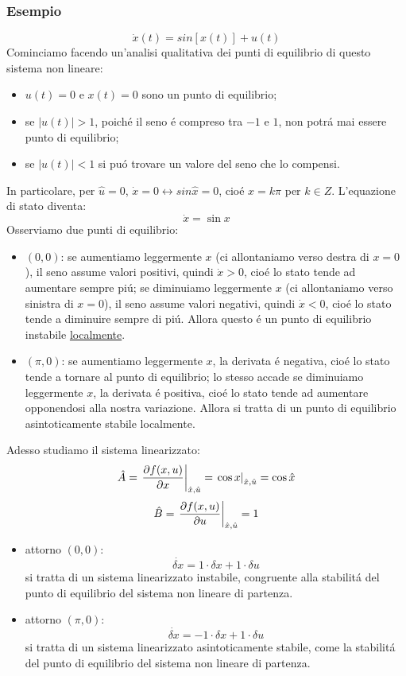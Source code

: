 \documentclass[../main.tex]{subfiles}
\begin{document}
	\subsubsection*{Esempio}
		\[ \dot x(t) = sin\left[ x(t) \right] + u(t) \]
		Cominciamo facendo un'analisi qualitativa dei punti di equilibrio di questo sistema non lineare:
		\begin{itemize}
			\item
				$ u(t) = 0 $ e $ x(t) = 0 $ sono un punto di equilibrio;
			\item
				se $ |u(t)|>1 $, poich\'e il seno \'e compreso tra $ -1 $ e $ 1 $, non potr\'a mai essere punto di equilibrio;
			\item
				se $ |u(t)|<1 $ si pu\'o trovare un valore del seno che lo compensi. 
		\end{itemize}
		
		In particolare, per $ \hat u = 0 $, $ \dot x = 0 \leftrightarrow sin \hat x = 0 $, cio\'e $ x = k\pi $ per $ k \in Z $. L'equazione di stato diventa:
		\[ \dot x = \sin x \]
		Osserviamo due punti di equilibrio:
		\begin{itemize}
			\item
				$ (0,0) $: se aumentiamo leggermente $ x $ (ci allontaniamo verso destra di $ x = 0 $), il seno assume valori positivi, quindi $ \dot x > 0 $, cio\'e lo stato tende ad aumentare sempre pi\'u; se diminuiamo leggermente $ x $ (ci allontaniamo verso sinistra di $ x = 0 $), il seno assume valori negativi, quindi $ \dot x < 0 $, cio\'e lo stato tende a diminuire sempre di pi\'u. Allora questo \'e un punto di equilibrio instabile \underline{localmente}.
			\item
				$ (\pi, 0) $: se aumentiamo leggermente $ x $, la derivata \'e negativa, cio\'e lo stato tende a tornare al punto di equilibrio; lo stesso accade se diminuiamo leggermente $ x $, la derivata \'e positiva, cio\'e lo stato tende ad aumentare opponendosi alla nostra variazione. Allora si tratta di un punto di equilibrio asintoticamente stabile localmente. 
		\end{itemize}
	
		Adesso studiamo il sistema linearizzato:
		\[ \hat A = \left. \frac{\partial f(x,u)}{\partial x}\right|_{\hat x, \hat u} = \left. \cos x \right|_{\hat x, \hat u} = \cos \hat x \]
		\[ \hat B = \left. \frac{\partial f(x,u)}{\partial u}\right|_{\hat x, \hat u} = 1 \]
		\begin{itemize}
			\item
				attorno $ (0,0) $:
				\[ \dot{\delta x} = 1 \cdot \delta x + 1 \cdot \delta u \]
				si tratta di un sistema linearizzato instabile, congruente alla stabilit\'a del punto di equilibrio del sistema non lineare di partenza.
			\item
				attorno $ (\pi, 0) $:
				\[ \dot{\delta x} = -1 \cdot \delta x + 1 \cdot \delta u \]
				si tratta di un sistema linearizzato asintoticamente stabile, come la stabilit\'a del punto di equilibrio del sistema non lineare di partenza.
		\end{itemize}
	
\end{document}
